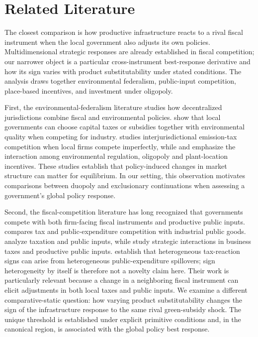 \section{Related Literature}
\label{sec:literature}

The closest comparison is how productive infrastructure reacts to a rival fiscal instrument when the local government also adjusts its own policies. Multidimensional strategic responses are already established in fiscal competition; our narrower object is a particular cross-instrument best-response derivative and how its sign varies with product substitutability under stated conditions. The analysis draws together environmental federalism, public-input competition, place-based incentives, and investment under oligopoly.

First, the environmental-federalism literature studies how decentralized jurisdictions combine fiscal and environmental policies. \citet{OatesSchwab1988} show that local governments can choose capital taxes or subsidies together with environmental quality when competing for industry. \citet{BayindirUpmann1998Emissions} studies interjurisdictional emission-tax competition when local firms compete imperfectly, while \citet{MarkusenMoreyOlewiler1993} and \citet{MarkusenMoreyOlewiler1995} emphasize the interaction among environmental regulation, oligopoly and plant-location incentives. These studies establish that policy-induced changes in market structure can matter for equilibrium. In our setting, this observation motivates comparisons between duopoly and exclusionary continuations when assessing a government's global policy response.

Second, the fiscal-competition literature has long recognized that governments compete with both firm-facing fiscal instruments and productive public inputs. \citet{BayindirUpmann1998PublicGoods} compares tax and public-expenditure competition with industrial public goods. \citet{BenassyQuereGobalrajaTrannoy2007} analyze taxation and public inputs, while \citet{HauptmeierMittermaierRincke2012} study strategic interactions in business taxes and productive public inputs. \citet{LevaggiPanteghini2021} establish that heterogeneous tax-reaction signs can arise from heterogeneous public-expenditure spillovers; sign heterogeneity by itself is therefore not a novelty claim here. Their work is particularly relevant because a change in a neighboring fiscal instrument can elicit adjustments in both local taxes and public inputs. We examine a different comparative-static question: how varying product substitutability changes the sign of the infrastructure response to the same rival green-subsidy shock. The unique threshold is established under explicit primitive conditions and, in the canonical region, is associated with the global policy best response.

